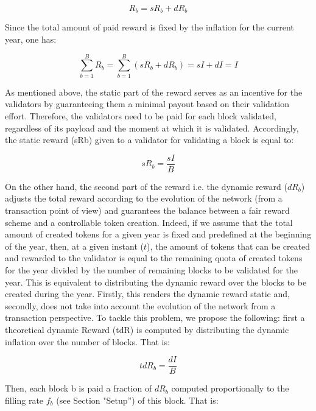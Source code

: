 \documentclass[conference]{IEEEtran}
\begin{document}
\begin{equation}
		R_b = sR_b +dR_b
\end{equation}
				
Since the total amount of paid reward is fixed by the inflation for the current year, one has:
					
\begin{equation}
		\sum_{b=1}^{B}R_b=\sum_{b=1}^{B}(sR_b +dR_b) =sI + dI = I 
\end{equation}

As mentioned above, the static part of the reward serves as an incentive for the validators by guaranteeing them a minimal payout based on their validation effort. Therefore, the validators  need to be paid for each block validated, regardless of its payload and the moment at which it is validated. Accordingly, the static reward (sRb) given to a validator for validating a block is equal to:
					
\begin{equation}
		sR_b=\frac{sI}{B}
\end{equation}
					
On the other hand, the second part of the reward i.e. the dynamic reward ($dR_b$) adjusts the total reward according to the evolution of the network (from a transaction point of view) and guarantees the balance between a fair reward scheme and a controllable token creation. Indeed, if we assume that the total amount of created tokens for a given year is fixed and predefined at the beginning of the year, then, at a given instant ($t$), the amount of tokens that can be created and rewarded to the validator is equal to the remaining quota of created tokens for the year divided by the number of remaining blocks to be validated for the year. This is equivalent to distributing the dynamic reward over the blocks to be created during the year. Firstly, this renders the dynamic reward static and, secondly, does not take into account the evolution of the network from a transaction perspective. To tackle this problem, we propose the following: first a theoretical dynamic Reward (tdR) is computed by distributing the dynamic inflation over the number of blocks. That is:
					
\begin{equation}
			tdR_b=\frac{dI}{B}
\end{equation}
					
Then, each block b is paid a fraction of $dR_b$ computed proportionally to the filling rate $f_b$ (see Section "Setup'') of this block. That is:
					
\end{document}
